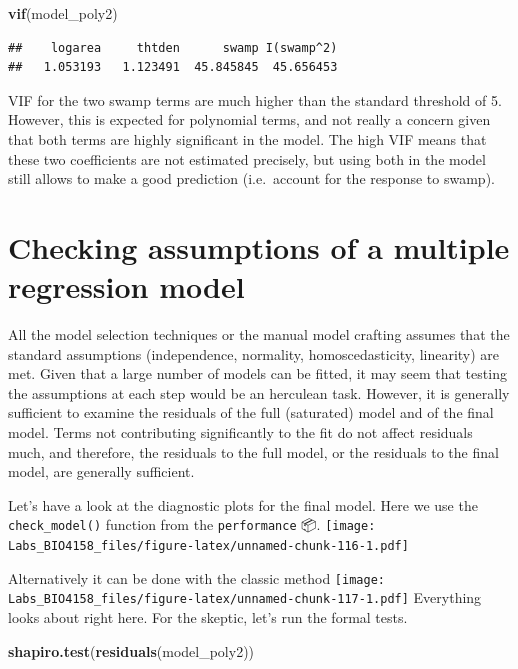 \documentclass[
  12pt,
]{book}
\newenvironment{Shaded}{\begin{snugshade}}{\end{snugshade}}
\newcommand{\KeywordTok}[1]{\textcolor[rgb]{0.13,0.29,0.53}{\textbf{#1}}}
\newcommand{\NormalTok}[1]{#1}
\begin{document}
\begin{Shaded}
\begin{Highlighting}[]
\KeywordTok{vif}\NormalTok{(model\_poly2)}
\end{Highlighting}
\end{Shaded}

\begin{verbatim}
##    logarea     thtden      swamp I(swamp^2) 
##   1.053193   1.123491  45.845845  45.656453
\end{verbatim}

VIF for the two swamp terms are much higher than the standard threshold of 5. However, this is expected for polynomial terms, and not really a concern given that both terms are highly significant in the model. The high VIF means that these two coefficients are not estimated precisely, but using both in the model still allows to make a good prediction (i.e.~account for the response to swamp).

\hypertarget{checking-assumptions-of-a-multiple-regression-model}{%
\section{Checking assumptions of a multiple regression model}\label{checking-assumptions-of-a-multiple-regression-model}}

All the model selection techniques or the manual model crafting assumes that the standard assumptions (independence, normality, homoscedasticity, linearity) are met. Given that a large number of models can be fitted, it may seem that testing the assumptions at each step would be an herculean task. However, it is generally sufficient to examine the residuals of the full (saturated) model and of the final model. Terms not contributing significantly to the fit do not affect residuals much, and therefore, the residuals to the full model, or the residuals to the final model, are generally sufficient.

Let's have a look at the diagnostic plots for the final model. Here we use the \texttt{check\_model()} function from the \texttt{performance} 📦.
\texttt{[image: Labs\_BIO4158\_files/figure-latex/unnamed-chunk-116-1.pdf]}

Alternatively it can be done with the classic method
\texttt{[image: Labs\_BIO4158\_files/figure-latex/unnamed-chunk-117-1.pdf]}
Everything looks about right here. For the skeptic, let's run the formal tests.

\begin{Shaded}
\begin{Highlighting}[]
\KeywordTok{shapiro.test}\NormalTok{(}\KeywordTok{residuals}\NormalTok{(model\_poly2))}
\end{Highlighting}
\end{Shaded}
\end{document}
